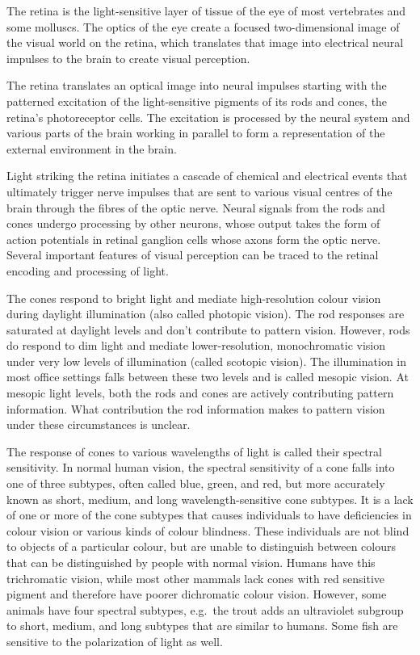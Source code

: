 The retina is the light-sensitive layer of tissue of the eye of most vertebrates and some molluscs. The optics of the eye create a focused two-dimensional image of the visual world on the retina, which translates that image into electrical neural impulses to the brain to create visual perception.

The retina translates an optical image into neural impulses starting with the patterned excitation of the light-sensitive pigments of its rods and cones, the retina's photoreceptor cells. The excitation is processed by the neural system and various parts of the brain working in parallel to form a representation of the external environment in the brain.

Light striking the retina initiates a cascade of chemical and electrical events that ultimately trigger nerve impulses that are sent to various visual centres of the brain through the fibres of the optic nerve. Neural signals from the rods and cones undergo processing by other neurons, whose output takes the form of action potentials in retinal ganglion cells whose axons form the optic nerve. Several important features of visual perception can be traced to the retinal encoding and processing of light.

The cones respond to bright light and mediate high-resolution colour vision during daylight illumination (also called photopic vision). The rod responses are saturated at daylight levels and don't contribute to pattern vision. However, rods do respond to dim light and mediate lower-resolution, monochromatic vision under very low levels of illumination (called scotopic vision). The illumination in most office settings falls between these two levels and is called mesopic vision. At mesopic light levels, both the rods and cones are actively contributing pattern information. What contribution the rod information makes to pattern vision under these circumstances is unclear.

The response of cones to various wavelengths of light is called their spectral sensitivity. In normal human vision, the spectral sensitivity of a cone falls into one of three subtypes, often called blue, green, and red, but more accurately known as short, medium, and long wavelength-sensitive cone subtypes. It is a lack of one or more of the cone subtypes that causes individuals to have deficiencies in colour vision or various kinds of colour blindness. These individuals are not blind to objects of a particular colour, but are unable to distinguish between colours that can be distinguished by people with normal vision. Humans have this trichromatic vision, while most other mammals lack cones with red sensitive pigment and therefore have poorer dichromatic colour vision. However, some animals have four spectral subtypes, e.g.~the trout adds an ultraviolet subgroup to short, medium, and long subtypes that are similar to humans. Some fish are sensitive to the polarization of light as well.

